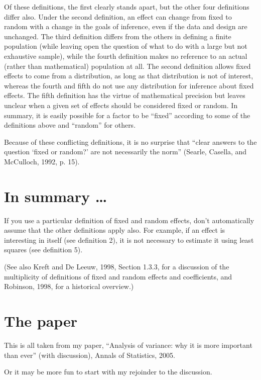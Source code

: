 \documentclass[stu,11pt]{apa7}
\begin{document}
Of these definitions, the first clearly stands apart, but the other four definitions differ also. Under the second definition, an effect can change from fixed to random with a change in the goals of inference, even if the data and design are unchanged. The third definition differs from the others in defining a finite population (while leaving open the question of what to do with a large but not exhaustive sample), while the fourth definition makes no reference to an actual (rather than mathematical) population at all. The second definition allows fixed effects to come from a distribution, as long as that distribution is not of interest, whereas the fourth and fifth do not use any distribution for inference about fixed effects. The fifth definition has the virtue of mathematical precision but leaves unclear when a given set of effects should be considered fixed or random. In summary, it is easily possible for a factor to be ``fixed'' according to some of the definitions above and ``random'' for others.

Because of these conflicting definitions, it is no surprise that ``clear answers to the question `fixed or random?' are not necessarily the norm'' (Searle, Casella, and McCulloch, 1992, p. 15).

\section{In summary \dots}

If you use a particular definition of fixed and random effects, don't automatically assume that the other definitions apply also. For example, if an effect is interesting in itself (see definition 2), it is not necessary to estimate it using least squares (see definition 5).

(See also Kreft and De Leeuw, 1998, Section 1.3.3, for a discussion of the multiplicity of definitions of fixed and random effects and coefficients, and Robinson, 1998, for a historical overview.)

\section{The paper}

This is all taken from my paper, ``Analysis of variance: why it is more important than ever'' (with discussion), Annals of Statistics, 2005.

Or it may be more fun to start with my rejoinder to the discussion.

\newpage
\end{document}
